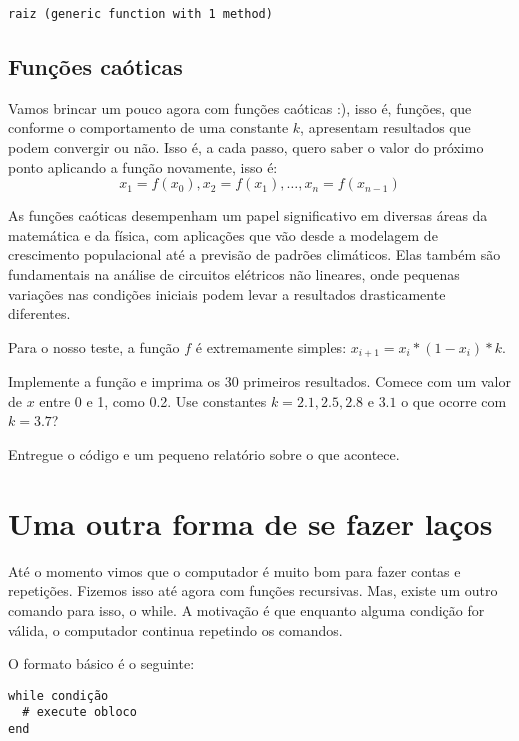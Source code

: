 \documentclass[
  letterpaper,
  DIV=11,
  numbers=noendperiod]{scrreprt}
\begin{document}
\begin{verbatim}
raiz (generic function with 1 method)
\end{verbatim}

\section{Funções caóticas}\label{funuxe7uxf5es-cauxf3ticas}

Vamos brincar um pouco agora com funções caóticas :), isso é, funções,
que conforme o comportamento de uma constante \(k\), apresentam
resultados que podem convergir ou não. Isso é, a cada passo, quero saber
o valor do próximo ponto aplicando a função novamente, isso é:
\[x_1 = f(x_0), x_2 = f(x_1), \ldots, x_n  = f(x_{n - 1})\]

As funções caóticas desempenham um papel significativo em diversas áreas
da matemática e da física, com aplicações que vão desde a modelagem de
crescimento populacional até a previsão de padrões climáticos. Elas
também são fundamentais na análise de circuitos elétricos não lineares,
onde pequenas variações nas condições iniciais podem levar a resultados
drasticamente diferentes.

Para o nosso teste, a função \(f\) é extremamente simples:
\(x_{i + 1}=x_i * (1 -  x_i) * k\).

Implemente a função e imprima os 30 primeiros resultados. Comece com um
valor de \(x\) entre 0 e 1, como 0.2. Use constantes
\(k = 2.1, 2.5, 2.8\) e \(3.1\) o que ocorre com \(k = 3.7\)?

Entregue o código e um pequeno relatório sobre o que acontece.


\chapter{Uma outra forma de se fazer
laços}\label{uma-outra-forma-de-se-fazer-lauxe7os}

Até o momento vimos que o computador é muito bom para fazer contas e
repetições. Fizemos isso até agora com funções recursivas. Mas, existe
um outro comando para isso, o while. A motivação é que enquanto alguma
condição for válida, o computador continua repetindo os comandos.

O formato básico é o seguinte:

\begin{verbatim}
while condição
  # execute obloco
end  
\end{verbatim}
\end{document}

